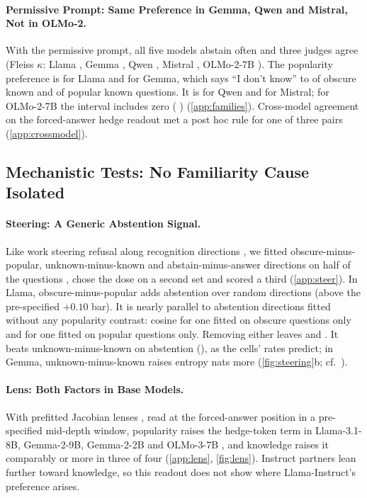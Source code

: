 \documentclass{article}
\newcommand{\idk}{``I don't know''}
\begin{document}
\paragraph{Permissive Prompt: Same Preference in Gemma, Qwen and Mistral, Not in OLMo-2.} With the permissive prompt, all five models abstain often and three judges agree (Fleiss $\kappa$: Llama \pmLlamaKappa, Gemma \pmGemmaKappa, Qwen \pmQwenKappa, Mistral \pmMistralKappa, OLMo-2-7B \pmOlmoKappa). The popularity preference is \pmLlamaDiff{} \pmLlamaDiffCI{} for Llama and \pmGemmaDiff{} \pmGemmaDiffCI{} for Gemma, which says \idk{} to \pmGemmaObsKnown{} of obscure known and \pmGemmaPopKnown{} of popular known questions. It is \pmQwenDiff{} \pmQwenDiffCI{} for Qwen and \pmMistralDiff{} \pmMistralDiffCI{} for Mistral; for OLMo-2-7B the interval includes zero (\pmOlmoDiff{} \pmOlmoDiffCI) (\cref{app:families}). Cross-model agreement on the forced-answer hedge readout met a post hoc rule for one of three pairs (\cref{app:crossmodel}).

\subsection{Mechanistic Tests: No Familiarity Cause Isolated}
\label{sec:mech}

\paragraph{Steering: A Generic Abstention Signal.} Like work steering refusal along recognition directions \citep{ferrando2025iknow,brzezinka2026familiarity}, we fitted obscure-minus-popular, unknown-minus-known and abstain-minus-answer directions on half of the questions \citep{arditi2024refusal,rimsky2024caa}, chose the dose on a second set and scored a third (\cref{app:steer}). In Llama, obscure-minus-popular adds \svLlamaDOne{} \svLlamaDOneCI{} abstention over random directions (above the pre-specified $+0.10$ bar). It is nearly parallel to abstention directions fitted without any popularity contrast: cosine \wlLlamaCos{} for one fitted on obscure questions only and \gaCos{} for one fitted on popular questions only. Removing either leaves \wlLlamaDTwo{} \wlLlamaDTwoCI{} and \gaPerp{} \gaPerpCI. It beats unknown-minus-known on abstention (\svLlamaDThree), as the cells' rates predict; in Gemma, unknown-minus-known raises entropy \svGemmaDFour{} \svGemmaDFourCI{} nats more (\cref{fig:steering}b; cf.\ \citealp{che2026steering}).

\paragraph{Lens: Both Factors in Base Models.} With prefitted Jacobian lenses \citep{gurnee2026workspace}, read at the forced-answer position in a pre-specified mid-depth window, popularity raises the hedge-token term in Llama-3.1-8B, Gemma-2-9B, Gemma-2-2B and OLMo-3-7B \citep{olmo3}, and knowledge raises it comparably or more in three of four (\cref{app:lens}, \cref{fig:lens}). Instruct partners lean further toward knowledge, so this readout does not show where Llama-Instruct's preference arises.
\end{document}
